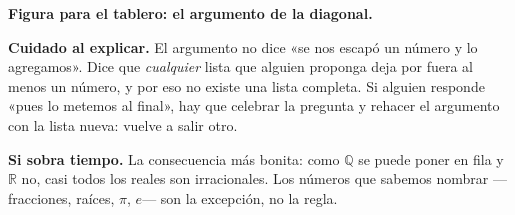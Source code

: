 \documentclass[11pt]{article}
\begin{document}
\textbf{Figura para el tablero: el argumento de la diagonal.}

\begin{center}
\end{center}

\begin{nota}
\textbf{Cuidado al explicar.} El argumento no dice «se nos escapó un número y lo agregamos».
Dice que \emph{cualquier} lista que alguien proponga deja por fuera al menos un número, y por
eso no existe una lista completa. Si alguien responde «pues lo metemos al final», hay que
celebrar la pregunta y rehacer el argumento con la lista nueva: vuelve a salir otro.
\end{nota}

\begin{nota}
\textbf{Si sobra tiempo.} La consecuencia más bonita: como $\mathbb{Q}$ se puede poner en fila
y $\mathbb{R}$ no, casi todos los reales son irracionales. Los números que sabemos nombrar
—fracciones, raíces, $\pi$, $e$— son la excepción, no la regla.
\end{nota}
\end{document}

